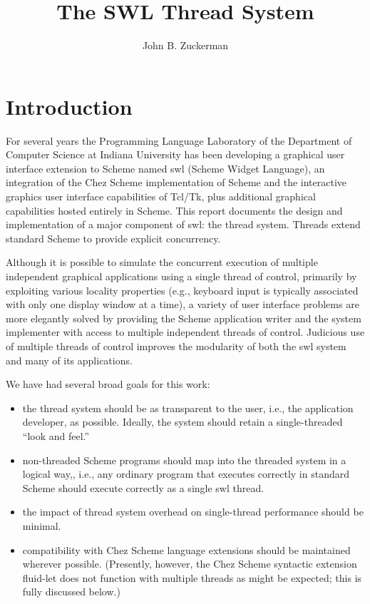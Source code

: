 \documentclass{article}
\title{The SWL Thread System}
\author{John B. Zuckerman}
\begin{document}
\maketitle



\section{Introduction}

For several years the Programming Language Laboratory of the
Department of Computer Science at Indiana University has been
developing a graphical user interface extension to Scheme named {\sc swl}
(Scheme Widget Language), an integration of the Chez Scheme
implementation of Scheme\cite{TSPL}\cite{CSSM} and the interactive
graphics user interface capabilities of Tcl/Tk\cite{TCLTK}, plus
additional graphical capabilities hosted entirely in Scheme.  This
report documents the design and implementation of a major component of
{\sc swl}: the thread system.  Threads extend standard Scheme to provide
explicit concurrency.

Although it is possible to simulate the concurrent execution of
multiple independent graphical applications using a single thread of
control, primarily by exploiting various locality properties (e.g.,
keyboard input is typically associated with only one display window at
a time), a variety of user interface problems are more elegantly
solved by providing the Scheme application writer and the system
implementer with access to multiple independent threads of
control. Judicious use of multiple threads of control improves the
modularity of both the {\sc swl} system and many of its applications.

We have had several broad goals for this work:

\begin{itemize}

\item the thread system should be as transparent to the user, i.e.,
the application developer, as possible.  Ideally, the system should
retain a single-threaded ``look and feel.''

\item non-threaded Scheme programs should map into the threaded system
in a logical way,, i.e., any ordinary program that executes correctly
in standard Scheme should execute correctly as a single {\sc swl} thread.

\item the impact of thread system overhead on single-thread performance
should be minimal.

\item compatibility with Chez Scheme language extensions should be
maintained wherever possible. (Presently, however, the Chez Scheme
syntactic extension {\sf fluid-let} does not function with multiple
threads as might be expected; this is fully discussed below.)

\end{itemize}
\end{document}
